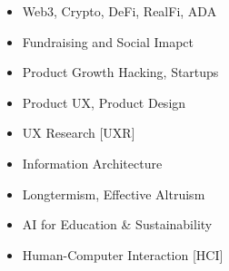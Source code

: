 

\begin{itemize}
 \setlength\itemsep{-0.3em}
\item Web3, Crypto, DeFi, RealFi, ADA%
\item Fundraising and Social Imapct
\item Product Growth Hacking, Startups
\item Product UX, Product Design %
\item UX Research [UXR]
\item Information Architecture
\item Longtermism, Effective Altruism
\item AI for Education \& Sustainability
\item Human-Computer Interaction [HCI]


\end{itemize}
